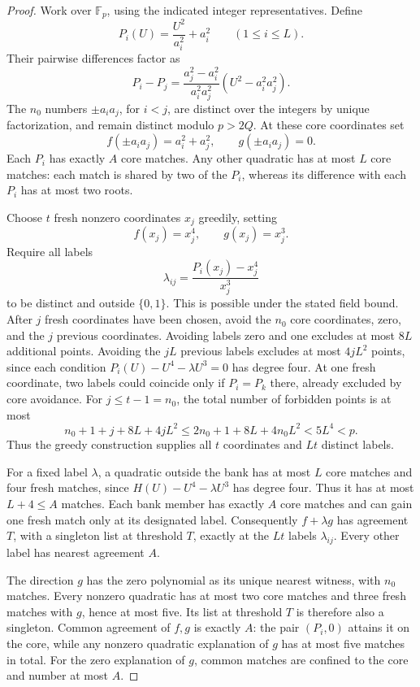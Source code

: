 \begin{proof}
Work over $\mathbb F_p$, using the indicated integer representatives. Define
\[
 P_i(U)=\frac{U^2}{a_i^2}+a_i^2\qquad(1\le i\le L).
\]
Their pairwise differences factor as
\[
 P_i-P_j=\frac{a_j^2-a_i^2}{a_i^2a_j^2}
          (U^2-a_i^2a_j^2).
\]
The $n_0$ numbers $\pm a_i a_j$, for $i<j$, are distinct over the
integers by unique factorization, and remain distinct modulo $p>2Q$. At these core coordinates set
\[
 f(\pm a_i a_j)=a_i^2+a_j^2,\qquad
 g(\pm a_i a_j)=0.
\]
Each $P_i$ has exactly $A$ core matches. Any other quadratic has at most
$L$ core matches: each match is shared by two of the $P_i$, whereas its
difference with each $P_i$ has at most two roots.

Choose $t$ fresh nonzero coordinates $x_j$ greedily, setting
\[
 f(x_j)=x_j^4,\qquad g(x_j)=x_j^3.
\]
Require all labels
\[
 \lambda_{ij}=\frac{P_i(x_j)-x_j^4}{x_j^3}
\]
to be distinct and outside $\{0,1\}$. This is possible under the stated
field bound. After $j$ fresh coordinates have been chosen, avoid the
$n_0$ core coordinates, zero, and the $j$ previous coordinates. Avoiding
labels zero and one excludes at most $8L$ additional points. Avoiding
the $jL$ previous labels excludes at most $4jL^2$ points, since each
condition $P_i(U)-U^4-\lambda U^3=0$ has degree four. At one fresh
coordinate, two labels could coincide only if $P_i=P_k$ there, already
excluded by core avoidance. For $j\le t-1=n_0$, the total number of
forbidden points is at most
\[
 n_0+1+j+8L+4jL^2
 \le 2n_0+1+8L+4n_0L^2<5L^4<p.
\]
Thus the greedy construction supplies all $t$ coordinates and $Lt$
distinct labels.

For a fixed label $\lambda$, a quadratic outside the bank has at most
$L$ core matches and four fresh matches, since
$H(U)-U^4-\lambda U^3$ has degree four. Thus it has at most
$L+4\le A$ matches. Each bank member has exactly $A$ core matches and
can gain one fresh match only at its designated label. Consequently
$f+\lambda g$ has agreement $T$, with a singleton list at threshold
$T$, exactly at the $Lt$ labels $\lambda_{ij}$. Every other label has
nearest agreement $A$.

The direction $g$ has the zero polynomial as its unique nearest
witness, with $n_0$ matches. Every nonzero quadratic has at most two
core matches and three fresh matches with $g$, hence at most five.
Its list at threshold $T$ is therefore also a singleton. Common
agreement of $f,g$ is exactly $A$: the pair $(P_i,0)$ attains it on
the core, while any nonzero quadratic explanation of $g$ has at most
five matches in total. For the zero explanation of $g$, common matches
are confined to the core and number at most $A$.


\end{proof}
